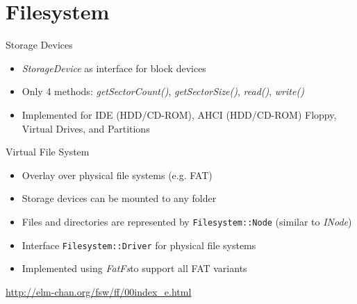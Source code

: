 \section{Filesystem}

\begin{frame}{Storage Devices}
	\begin{itemize}
		\setlength\itemsep{1em}
		\item \textit{StorageDevice} as interface for block devices
		\item Only 4 methods: \textit{getSectorCount()}, \textit{getSectorSize()}, \textit{read()}, \textit{write()}
		\item Implemented for IDE (HDD/CD-ROM), AHCI (HDD/CD-ROM) Floppy, Virtual Drives, and Partitions
	\end{itemize}	
\end{frame}

\begin{frame}{Virtual File System}
	\begin{itemize}
		\setlength\itemsep{1em}
		\item Overlay over physical file systems (e.g. FAT)
		\item Storage devices can be mounted to any folder
		\item Files and directories are represented by \texttt{Filesystem::Node} (similar to \textit{INode})
		\item Interface \texttt{Filesystem::Driver} for physical file systems
		\item Implemented using \textit{FatFs}\footnotemark[1] to support all FAT variants
	\end{itemize}
	\vspace{3.0em}
	\footnotemark[1]\footnotesize{\url{http://elm-chan.org/fsw/ff/00index_e.html}}
\end{frame}

